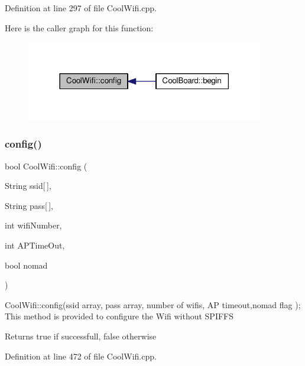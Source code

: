 Definition at line 297 of file Cool\+Wifi.\+cpp.

Here is the caller graph for this function\+:
\nopagebreak
\begin{figure}[H]
\begin{center}
\leavevmode
\includegraphics[width=294pt]{class_cool_wifi_a4eb2f6b9b09dd588964b88b6c70122c0_icgraph}
\end{center}
\end{figure}
\mbox{\label{class_cool_wifi_a2a9a546f76816c8c5c8e2d46a6c4f07d}} 
\subsubsection{\texorpdfstring{config()}{config()}\hspace{0.1cm}{\footnotesize\ttfamily [2/2]}}
{\footnotesize\ttfamily bool Cool\+Wifi\+::config (\begin{DoxyParamCaption}\item[{String}]{ssid\mbox{[}$\,$\mbox{]},  }\item[{String}]{pass\mbox{[}$\,$\mbox{]},  }\item[{int}]{wifi\+Number,  }\item[{int}]{A\+P\+Time\+Out,  }\item[{bool}]{nomad }\end{DoxyParamCaption})}

Cool\+Wifi\+::config(ssid array, pass array, number of wifis, A\+P timeout,nomad flag ); This method is provided to configure the Wifi without S\+P\+I\+F\+FS

\begin{DoxyReturn}{Returns}
true if successfull, false otherwise 
\end{DoxyReturn}


Definition at line 472 of file Cool\+Wifi.\+cpp.

\mbox{\label{class_cool_wifi_ad060353050f40d032a2dbf9e54a768bf}} 
